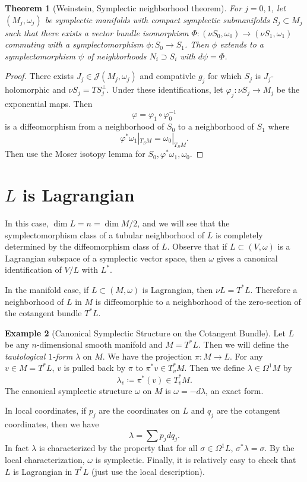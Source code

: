 \documentclass[leqno, openany]{memoir}
\newtheorem{thm}{Theorem}[chapter]
\theoremstyle{definition}
\newtheorem{exm}[thm]{Example}
\theoremstyle{remark}
\theoremstyle{plain}
\theoremstyle{definition}
\theoremstyle{remark}
\newcommand{\mc}[1]{\mathcal{#1}}
\begin{document}
    \begin{thm}[Weinstein, Symplectic neighborhood theorem]
        For $j = 0,1$, let $(M_j, \omega_j)$ be symplectic manifolds with compact symplectic submanifolds $S_j \subset M_j$ such that there exists a vector bundle isomorphism $\Phi: (\nu S_0, \omega_0) \to (\nu S_1, \omega_1)$ commuting with a symplectomorphism $\phi: S_0 \to S_1$. Then $\phi$ extends to a symplectomorphism $\psi$ of neighborhoods $N_i \supset S_i$ with $d \psi = \Phi$.
    \end{thm}

    \begin{proof}
        There exists $J_j \in \mc{J}(M_j, \omega_j)$ and compativle $g_j$ for which $S_j$ is $J_j$-holomorphic and $\nu S_j = TS_j^{\perp}$. Under these identifications, let $\varphi_j: \nu S_j \to M_j$ be the exponential maps. Then 
        \[\varphi = \varphi_1 \circ\varphi_0^{-1}\] 
        is a diffeomorphism from a neighborhood of $S_0$ to a neighborhood of $S_1$ where
        \[ \varphi^* \omega_1 |_{T_S M} = \omega_0 |_{T_S M}. \]
        Then use the Moser isotopy lemma for $S_0, \varphi^* \omega_1, \omega_0$.
    \end{proof}

    \section{$L$ is Lagrangian}%
    \label{sub:_l_is_lagrangian}

    In this case, $\dim L = n = \dim M / 2$, and we will see that the symplectomorphism class of a tubular neighborhood of $L$ is completely determined by the diffeomorphism class of $L$. Observe that if $L \subset (V, \omega)$ is a Lagrangian subspace of a symplectic vector space, then $\omega$ gives a canonical identification of $V/L$ with $L^*$.

    In the manifold case, if $L \subset (M, \omega)$ is Lagrangian, then $\nu L = T^* L$. Therefore a neighborhood of $L$ in $M$ is diffeomorphic to a neighborhood of the zero-section of the cotangent bundle $T^*L$.

    \begin{exm}[Canonical Symplectic Structure on the Cotangent Bundle]
        Let $L$ be any $n$-dimensional smooth manifold and $M = T^*L$. Then we will define the \textit{tautological $1$-form} $\lambda$ on $M$. We have the projection $\pi: M \to L$. For any $v \in M = T^* L$, $v$ is pulled back by $\pi$ to $\pi^* v \in T^*_v M$. Then we define $\lambda \in \Omega^1 M$ by
        \[ \lambda_v \coloneqq \pi^*(v) \in T^*_v M. \]
        The canonical symplectic structure $\omega$ on $M$ is $\omega = -d \lambda$, an exact form.

        In local coordinates, if $p_j$ are the coordinates on $L$ and $q_j$ are the cotangent coordinates, then we have
        \[ \lambda = \sum p_j d q_j. \]
        In fact $\lambda$ is characterized by the property that for all $\sigma \in \Omega^1 L$, $\sigma^* \lambda = \sigma$. By the local characterization, $\omega$ is symplectic. Finally, it is relatively easy to check that $L$ is Lagrangian in $T^*L$ (just use the local description).
    \end{exm}
\end{document}
